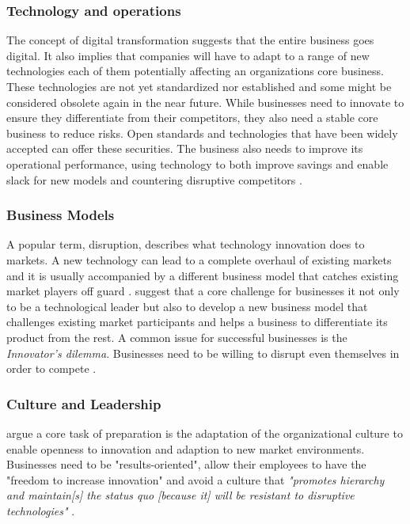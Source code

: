 \subsubsection{Technology and operations}
The concept of digital transformation suggests that the entire business goes digital. It also implies that companies will have to adapt to a range of new technologies %
 each of them potentially affecting an organizations core business. These technologies are not yet standardized nor established and some might be considered obsolete again in the near future. While businesses need to innovate to ensure they differentiate from their competitors, %
 they also need a stable core business to reduce risks. Open standards and technologies that have been widely accepted can offer these securities.
The business also needs to improve its operational performance, using technology to both improve savings and enable slack for new models and countering disruptive competitors \cite[p.15ff.]{worldforumdigitalenterprise:2016}.


\subsubsection{Business Models}
A popular term, disruption, describes what technology innovation does to markets. A new technology can lead to a complete overhaul of existing markets and it is usually accompanied by a different business model that catches existing market players off guard \cite{LucasJr200946}. \citeauthor{gassmann:gallen:2013geschaeftsmodelle} suggest that a core challenge for businesses it not only to be a technological leader but also to develop a new business model that challenges existing market participants and helps a business to differentiate its product from the rest. A common issue for successful businesses is the \emph{Innovator's dilemma}. Businesses need to be willing to disrupt even themselves in order to compete \cite{christensen1997innovator, worldforumdigitalenterprise:2016}.

\subsubsection{Culture and Leadership}
\citeauthor{hammer:2015, LucasJr200946} argue a core task of preparation is the adaptation of the organizational culture to enable openness to innovation and adaption to new market environments. Businesses need to be "results-oriented", allow their employees to have the "freedom to increase innovation"\cite{hammer:2015} and avoid a culture that \emph{"promotes hierarchy and maintain[s] the status quo [because it] will be resistant to disruptive technologies"} \cite{LucasJr200946}.
